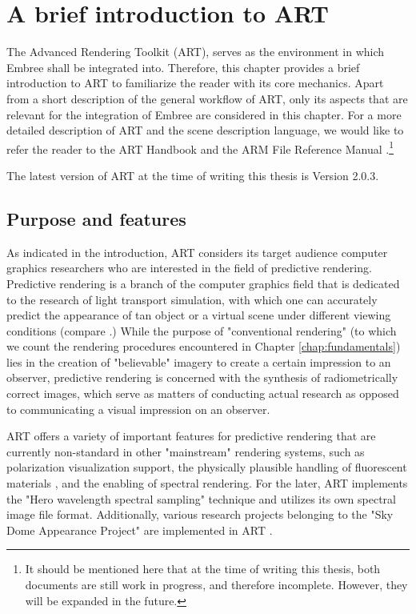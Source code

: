 \chapter{A brief introduction to ART}
\label{chap:art}

The Advanced Rendering Toolkit (ART), serves as the environment in which Embree shall be integrated into. Therefore, this chapter provides a brief introduction to ART to familiarize the reader with its core mechanics. Apart from a short description of the general workflow of ART, only its aspects that are relevant for the integration of Embree are considered in this chapter. For a more detailed description of ART and the scene description language, we would like to refer the reader to the ART Handbook \cite{arthandbook} and the ARM File Reference Manual \cite{artreferencemanual}.\footnote{It should be mentioned here that at the time of writing this thesis, both documents are still work in progress, and therefore incomplete. However, they will be expanded in the future.}

The latest version of ART at the time of writing this thesis is Version 2.0.3.


\section{Purpose and features}

As indicated in the introduction, ART considers its target audience computer graphics researchers who are interested in the field of predictive rendering. Predictive rendering is a branch of the computer graphics field that is dedicated to the research of light transport simulation, with which one can accurately predict the appearance of tan object or a virtual scene under different viewing conditions (compare \cite{wilkie2009predictive}.)  While the purpose of "conventional rendering" (to which we count the rendering procedures encountered in Chapter \ref{chap:fundamentals}) lies in the creation of "believable" imagery to create a certain impression to an observer, predictive rendering is concerned with the synthesis of radiometrically correct images, which serve as matters of conducting actual research as opposed to communicating a visual impression on an observer.

ART offers a variety of important features for predictive rendering that are currently non-standard in other "mainstream" rendering systems, such as polarization visualization support, the physically plausible handling of fluorescent materials \cite{mojzik2018handling}, and the enabling of spectral rendering. For the later, ART implements the "Hero wavelength spectral sampling" technique \cite{wilkie2014hero} and utilizes its own spectral image file format. Additionally, various research projects belonging to the "Sky Dome Appearance Project" are implemented in ART \cite{hosek2012analytic, hovsek2013adding, wilkie2013predicting}.


